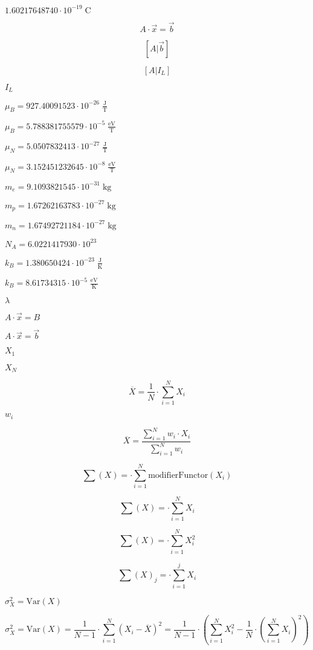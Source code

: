 \documentclass{article}
\begin{document}
$ 1.60217648740\cdot 10^{-19}\;\mathrm{C}$
\pagebreak

\[ A\cdot\vec{x}=\vec{b} \]
\pagebreak

\[ \left[A | \vec{b}\right] \]
\pagebreak

\[ \left[A | I_L\right] \]
\pagebreak

$ I_L $
\pagebreak

$ \mu_B= 927.40091523\cdot 10^{-26}\;\mathrm{\frac{J}{T}} $
\pagebreak

$ \mu_B=5.788381755579\cdot 10^{-5}\;\mathrm{\frac{eV}{T}} $
\pagebreak

$ \mu_N=5.0507832413\cdot 10^{-27}\;\mathrm{\frac{J}{T}} $
\pagebreak

$ \mu_N=3.152451232645\cdot 10^{-8}\;\mathrm{\frac{eV}{T}} $
\pagebreak

$ m_e= 9.1093821545\cdot 10^{-31}\;\mathrm{kg} $
\pagebreak

$ m_p= 1.67262163783\cdot 10^{-27}\;\mathrm{kg} $
\pagebreak

$ m_n= 1.67492721184\cdot 10^{-27}\;\mathrm{kg} $
\pagebreak

$ N_A= 6.0221417930\cdot 10^{23} $
\pagebreak

$ k_B=1.380650424\cdot 10^{-23}\;\mathrm{\frac{J}{K}} $
\pagebreak

$ k_B=8.61734315\cdot 10^{-5}\;\mathrm{\frac{eV}{K}} $
\pagebreak

$ \lambda $
\pagebreak

$ A\cdot\vec{x}=B $
\pagebreak

$ A\cdot\vec{x}=\vec{b} $
\pagebreak

$ X_1 $
\pagebreak

$ X_N $
\pagebreak

\[ \overline{X}=\frac{1}{N}\cdot\sum\limits_{i=1}^{N}X_i \]
\pagebreak

$ w_i $
\pagebreak

\[ \overline{X}=\frac{\sum\limits_{i=1}^{N}w_i\cdot X_i}{\sum\limits_{i=1}^{N}w_i} \]
\pagebreak

\[ \sum(X)=\cdot\sum\limits_{i=1}^{N}\mbox{modifierFunctor}(X_i) \]
\pagebreak

\[ \sum(X)=\cdot\sum\limits_{i=1}^{N}X_i \]
\pagebreak

\[ \sum(X)=\cdot\sum\limits_{i=1}^{N}X_i^2 \]
\pagebreak

\[ \sum(X)_j=\cdot\sum\limits_{i=1}^{j}X_i \]
\pagebreak

$ \sigma_X^2=\mbox{Var}(X) $
\pagebreak

\[ \sigma_X^2=\text{Var}(X)=\frac{1}{N-1}\cdot\sum\limits_{i=1}^{N}(X_i-\overline{X})^2=\frac{1}{N-1}\cdot\left(\sum_{i=1}^NX_i^2-\frac{1}{N}\cdot\left(\sum_{i=1}^NX_i\right)^2\right) \]
\pagebreak
\end{document}
